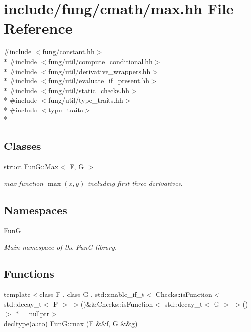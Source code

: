 \hypertarget{max_8hh}{}\section{include/fung/cmath/max.hh File Reference}
\label{max_8hh}
{\ttfamily \#include $<$fung/constant.\+hh$>$}\\*
{\ttfamily \#include $<$fung/util/compute\+\_\+conditional.\+hh$>$}\\*
{\ttfamily \#include $<$fung/util/derivative\+\_\+wrappers.\+hh$>$}\\*
{\ttfamily \#include $<$fung/util/evaluate\+\_\+if\+\_\+present.\+hh$>$}\\*
{\ttfamily \#include $<$fung/util/static\+\_\+checks.\+hh$>$}\\*
{\ttfamily \#include $<$fung/util/type\+\_\+traits.\+hh$>$}\\*
{\ttfamily \#include $<$type\+\_\+traits$>$}\\*
\subsection*{Classes}
\begin{DoxyCompactItemize}
\item 
struct \hyperlink{structFunG_1_1Max}{Fun\+G\+::\+Max$<$ F, G $>$}
\begin{DoxyCompactList}\small\item\em max function $ \max(x,y) $ including first three derivatives. \end{DoxyCompactList}\end{DoxyCompactItemize}
\subsection*{Namespaces}
\begin{DoxyCompactItemize}
\item 
 \hyperlink{namespaceFunG}{FunG}
\begin{DoxyCompactList}\small\item\em Main namespace of the FunG library. \end{DoxyCompactList}\end{DoxyCompactItemize}
\subsection*{Functions}
\begin{DoxyCompactItemize}
\item 
{\footnotesize template$<$class F , class G , std\+::enable\+\_\+if\+\_\+t$<$ Checks\+::is\+Function$<$ std\+::decay\+\_\+t$<$ F $>$ $>$()\&\&\+Checks\+::is\+Function$<$ std\+::decay\+\_\+t$<$ G $>$ $>$() $>$ $\ast$  = nullptr$>$ }\\decltype(auto) \hyperlink{group__CMathGroup_ga29ce7b8f01cdb2c87da6b39f16d37925}{Fun\+G\+::max} (F \&\&f, G \&\&g)
\end{DoxyCompactItemize}
